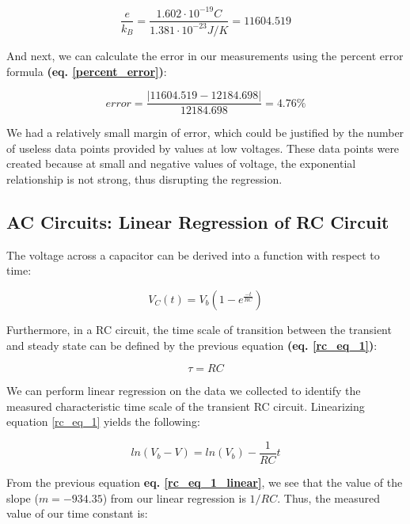 \documentclass{article}
\begin{document}
\begin{equation}
    \label{boltzmann_analysis_3}
    \frac{e}{k_{B}} = \frac{1.602\cdot10^{-19}C}{1.381\cdot10^{-23}J/K} =
    11604.519
\end{equation}

And next, we can calculate the error in our measurements using the percent error
formula \textbf{(eq. \ref{percent_error})}:

\begin{equation}
    \label{boltzmann_err_analysis_1}
    error = \frac{|11604.519-12184.698|}{12184.698} = 4.76\%
\end{equation}

We had a relatively small margin of error, which could be justified by the
number of useless data points provided by values at low voltages. These data
points were created because at small and negative values of voltage, the
exponential relationship is not strong, thus disrupting the regression.

\subsection{AC Circuits: Linear Regression of RC Circuit}

The voltage across a capacitor can be derived into a function with respect to
time:

\begin{equation}
    \label{rc_eq_1}
    V_{C}(t)=V_{b}(1-e^{\frac{-t}{RC}})
\end{equation}

Furthermore, in a RC circuit, the time scale of transition between the transient
and steady state can be defined by the previous equation \textbf{(eq.
\ref{rc_eq_1})}:

\begin{equation}
    \label{rc_timescale}
    \tau=RC
\end{equation}

We can perform linear regression on the data we collected to identify the
measured characteristic time scale of the transient RC circuit. Linearizing
equation \ref{rc_eq_1} yields the following:

\begin{equation}
    \label{rc_eq_1_linear}
    ln(V_{b}-V)=ln(V_{b})-\frac{1}{RC}t
\end{equation}

From the previous equation \textbf{eq. \ref{rc_eq_1_linear}}, we see that the
value of the slope ($m=-934.35$) from our linear regression is $1/RC$. Thus, the
measured value of our time constant is:
\end{document}
